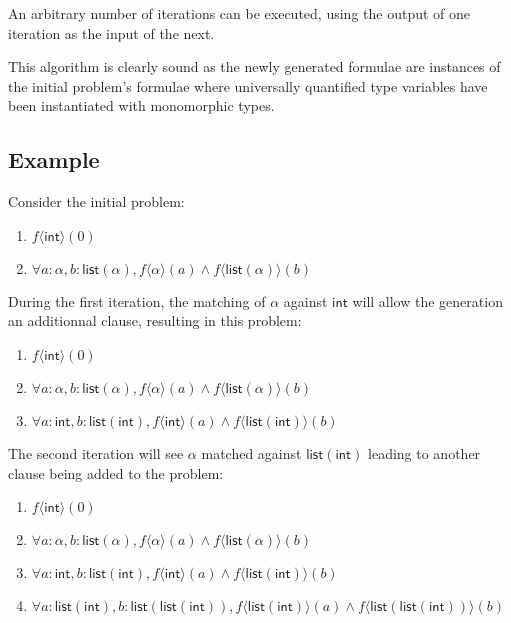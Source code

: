 \documentclass[]{ceurart}
\newcommand\ty[1]{\textsf{#1}}
\begin{document}
An arbitrary number of iterations can be executed, using the output of one iteration as the input of the next.

This algorithm is clearly sound as the newly generated formulae are instances of the initial problem's formulae where universally quantified type variables have been instantiated with monomorphic types.

\subsection{Example}

Consider the initial problem:
\begin{enumerate}
   \item \(f\langle \ty{int}\rangle(0)\)
   \item \(\forall a: \alpha, b:\ty{list}(\alpha), f\langle\alpha\rangle(a) \land f\langle \ty{list}(\alpha)\rangle(b)\)
\end{enumerate}

During the first iteration, the matching of \(\alpha\) against \(\ty{int}\) will allow the generation an additionnal clause, resulting in this problem:

\begin{enumerate}
   \item \(f\langle \ty{int}\rangle(0)\)
   \item \(\forall a: \alpha, b:\ty{list}(\alpha), f\langle\alpha\rangle(a) \land f\langle \ty{list}(\alpha)\rangle(b)\)
   \item \(\forall a: \ty{int}, b:\ty{list}(\ty{int}), f\langle\ty{int}\rangle(a) \land f\langle \ty{list}(\ty{int})\rangle(b)\)
\end{enumerate}

The second iteration will see \(\alpha\) matched against \(\ty{list}(\ty{int})\) leading to another clause being added to the problem:

\begin{enumerate}
   \item \(f\langle \ty{int}\rangle(0)\)
   \item \(\forall a: \alpha, b:\ty{list}(\alpha), f\langle\alpha\rangle(a) \land f\langle \ty{list}(\alpha)\rangle(b)\)
   \item \(\forall a: \ty{int}, b:\ty{list}(\ty{int}), f\langle\ty{int}\rangle(a) \land f\langle \ty{list}(\ty{int})\rangle(b)\)
   \item \(\forall a: \ty{list}(\ty{int}), b:\ty{list}(\ty{list}(\ty{int})), f\langle\ty{list}(\ty{int})\rangle(a) \land f\langle \ty{list}(\ty{list}(\ty{int}))\rangle(b)\)
\end{enumerate}
\end{document}
